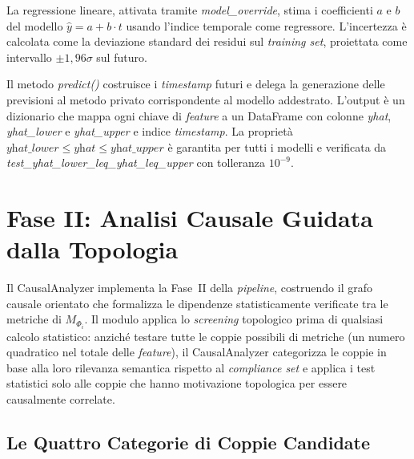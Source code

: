 La regressione lineare, attivata tramite \textit{model\_override}, stima i coefficienti $a$ e $b$
del modello $\hat{y} = a + b \cdot t$ usando l'indice temporale come regressore. L'incertezza è
calcolata come la deviazione standard dei residui sul \textit{training set}, proiettata come
intervallo $\pm 1{,}96\sigma$ sul futuro.

Il metodo \textit{predict()} costruisce i \textit{timestamp} futuri e delega la generazione
delle previsioni al metodo privato corrispondente al modello addestrato. L'output è un dizionario
che mappa ogni chiave di \textit{feature} a un DataFrame con colonne \textit{yhat},
\textit{yhat\_lower} e \textit{yhat\_upper} e indice \textit{timestamp}. La proprietà
$\textit{yhat\_lower} \leq \textit{yhat} \leq \textit{yhat\_upper}$ è garantita per tutti i
modelli e verificata da \textit{test\_yhat\_lower\_leq\_yhat\_leq\_upper} con tolleranza
$10^{-9}$.

\section{Fase II: Analisi Causale Guidata dalla Topologia}
\label{sec:impl_fase2}

Il CausalAnalyzer implementa la Fase~II della \textit{pipeline}, costruendo il grafo causale
orientato che formalizza le dipendenze statisticamente verificate tra le metriche di $M_{\Phi_i}$.
Il modulo applica lo \textit{screening} topologico prima di qualsiasi calcolo statistico:
anziché testare tutte le coppie possibili di metriche (un numero quadratico nel totale delle
\textit{feature}), il CausalAnalyzer categorizza le coppie in base alla loro rilevanza
semantica rispetto al \textit{compliance set} e applica i test statistici solo alle coppie
che hanno motivazione topologica per essere causalmente correlate.

\subsection{Le Quattro Categorie di Coppie Candidate}
\label{subsec:causal_pairs}

